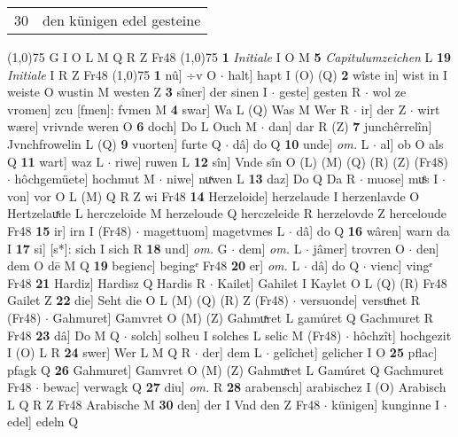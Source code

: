 \documentclass[8pt,a4paper,notitlepage]{article}
\begin{document}
\begin{table}[ht]
\begin{minipage}[t]{0.5\linewidth}
\begin{tabular}{rl}
30 & den künigen edel gesteine\\ 
\end{tabular}
\scriptsize
\line(1,0){75} \newline
G I O L M Q R Z Fr48 \newline
\line(1,0){75} \newline
\textbf{1} \textit{Initiale} I O M  \textbf{5} \textit{Capitulumzeichen} L  \textbf{19} \textit{Initiale} I R Z Fr48  \newline
\line(1,0){75} \newline
\textbf{1} nû] ÷v O  $\cdot$ halt] hapt I (O) (Q) \textbf{2} wîste in] wist in I weiste O wustin M westen Z \textbf{3} sîner] der sinen I  $\cdot$ geste] gesten R  $\cdot$ wol ze vromen] zcu [fmen]: fvmen M \textbf{4} swar] Wa L (Q) Was M Wer R  $\cdot$ ir] der Z  $\cdot$ wirt wære] vrivnde weren O \textbf{6} doch] Do L Ouch M  $\cdot$ dan] dar R (Z) \textbf{7} junchêrrelîn] Jvnchfrowelin L (Q) \textbf{9} vuorten] furte Q  $\cdot$ dâ] do Q \textbf{10} unde] \textit{om.} L  $\cdot$ al] ob O als Q \textbf{11} wart] waz L  $\cdot$ riwe] ruwen L \textbf{12} sîn] Vnde sîn O (L) (M) (Q) (R) (Z) (Fr48)  $\cdot$ hôchgemüete] hochmut M  $\cdot$ niwe] nuͯwen L \textbf{13} daz] Do Q Da R  $\cdot$ muose] muͤs I  $\cdot$ von] vor O L (M) Q R Z wi Fr48 \textbf{14} Herzeloide] herzelaude I herzenlavde O Hertzelauͯde L herczeloide M herzeloude Q herczeleide R herzelovde Z herceloude Fr48 \textbf{15} ir] irn I (Fr48)  $\cdot$ magettuom] magetvmes L  $\cdot$ dâ] do Q \textbf{16} wâren] warn da I \textbf{17} si] [s*]: sich I sich R \textbf{18} und] \textit{om.} G  $\cdot$ dem] \textit{om.} L  $\cdot$ jâmer] trovren O  $\cdot$ den] dem O dē M Q \textbf{19} begienc] begingᵉ Fr48 \textbf{20} er] \textit{om.} L  $\cdot$ dâ] do Q  $\cdot$ vienc] vingᵉ Fr48 \textbf{21} Hardiz] Hardisz Q Hardis R  $\cdot$ Kailet] Gahilet I Kaylet O L (Q) (R) Fr48 Gailet Z \textbf{22} die] Seht die O L (M) (Q) (R) Z (Fr48)  $\cdot$ versuonde] versuͦnet R (Fr48)  $\cdot$ Gahmuret] Gamvret O (M) (Z) Gahmuͯret L gamúret Q Gachmuret R Fr48 \textbf{23} dâ] Do M Q  $\cdot$ solch] solheu I solches L selic M (Fr48)  $\cdot$ hôchzît] hochgezit I (O) L R \textbf{24} swer] Wer L M Q R  $\cdot$ der] dem L  $\cdot$ gelîchet] gelicher I O \textbf{25} pflac] pfagk Q \textbf{26} Gahmuret] Gamvret O (M) (Z) Gahmuͯret L Gamúret Q Gachmuret Fr48  $\cdot$ bewac] verwagk Q \textbf{27} diu] \textit{om.} R \textbf{28} arabensch] arabischez I (O) Arabisch L Q R Z Fr48 Arabische M \textbf{30} den] der I Vnd den Z Fr48  $\cdot$ künigen] kunginne I  $\cdot$ edel] edeln Q \newline

\end{minipage}
\end{table}
\end{document}

